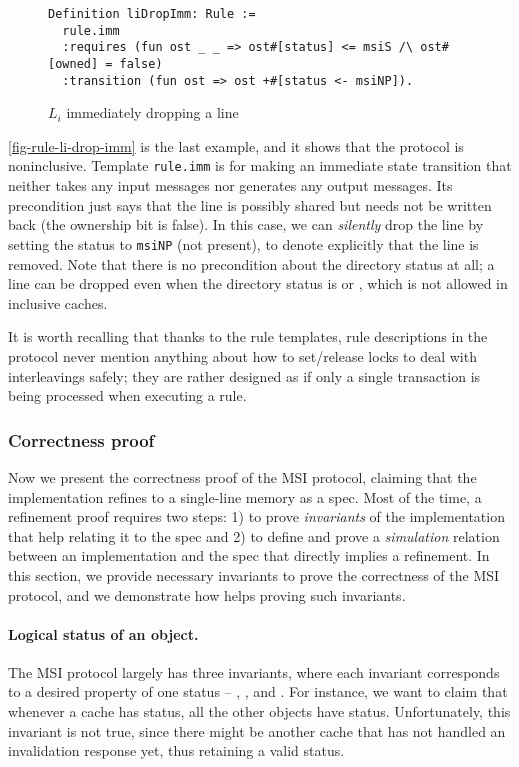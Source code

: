 \documentclass[sigplan,10pt,review,anonymous,screen]{acmart}\settopmatter{printfolios=true,printccs=false,printacmref=false}
\def\slstinline{\lstinline[basicstyle=\ttfamily\small]}
\begin{document}
\begin{figure}[h]
  \centering
\begin{lstlisting}
Definition liDropImm: Rule :=
  rule.imm
  :requires (fun ost _ _ => ost#[status] <= msiS /\ ost#[owned] = false)
  :transition (fun ost => ost +#[status <- msiNP]).
\end{lstlisting}
  \caption{$L_i$ immediately dropping a line}
  \label{fig-rule-li-drop-imm}
\end{figure}

\autoref{fig-rule-li-drop-imm} is the last example, and it shows that the protocol is noninclusive.
Template \slstinline{rule.imm} is for making an immediate state transition that neither takes any input messages nor generates any output messages.
Its precondition just says that the line is possibly shared but needs not be written back (the ownership bit is false).
In this case, we can \emph{silently} drop the line by setting the status to \slstinline{msiNP} (not present), to denote explicitly that the line is removed.
Note that there is no precondition about the directory status at all; a line can be dropped even when the directory status is \stS{} or \stM{}, which is not allowed in inclusive caches.

It is worth recalling that thanks to the rule templates, rule descriptions in the protocol never mention anything about how to set/release locks to deal with interleavings safely; they are rather designed as if only a single transaction is being processed when executing a rule.

\subsubsection{Correctness proof}
\label{sec-msi-proof}

Now we present the correctness proof of the MSI protocol, claiming that the implementation refines to a single-line memory as a spec.
Most of the time, a refinement proof requires two steps: 1) to prove \emph{invariants} of the implementation that help relating it to the spec and 2) to define and prove a \emph{simulation} relation between an implementation and the spec that directly implies a refinement.
In this section, we provide necessary invariants to prove the correctness of the MSI protocol, and we demonstrate how \hemiola{} helps
proving such invariants.

\paragraph{Logical status of an object.}
The MSI protocol largely has three invariants, where each invariant corresponds to a desired property of one status -- \stM{}, \stS{}, and \stI{}.
For instance, we want to claim that whenever a cache has \stM{} status, all the other objects have \stI{} status.
Unfortunately, this invariant is not true, since there might be another cache that has not handled an invalidation response yet, thus retaining a valid status.
\end{document}

